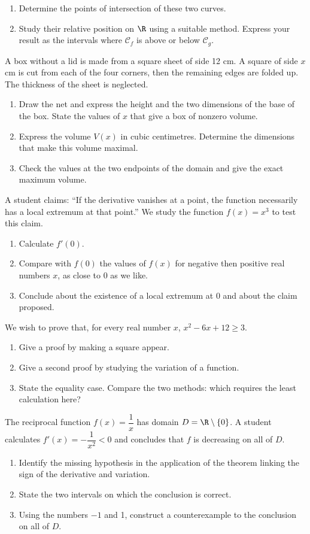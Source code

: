 \begin{enumerate}[label=\arabic*.]
\item Determine the points of intersection of these two curves.
\item Study their relative position on $\R$ using a suitable method. Express your result as the intervals where $\mathcal C_f$ is above or below $\mathcal C_g$.
\end{enumerate}
A box without a lid is made from a square sheet of side 12 cm. A square of side $x$ cm is cut from each of the four corners, then the remaining edges are folded up. The thickness of the sheet is neglected.
\begin{enumerate}[label=\arabic*.]
\item Draw the net and express the height and the two dimensions of the base of the box. State the values of $x$ that give a box of nonzero volume.
\item Express the volume $V(x)$ in cubic centimetres. Determine the dimensions that make this volume maximal.
\item Check the values at the two endpoints of the domain and give the exact maximum volume.
\end{enumerate}
A student claims: ``If the derivative vanishes at a point, the function necessarily has a local extremum at that point.'' We study the function $f(x)=x^3$ to test this claim.
\begin{enumerate}[label=\arabic*.]
\item Calculate $f\prime(0)$.
\item Compare with $f(0)$ the values of $f(x)$ for negative then positive real numbers $x$, as close to 0 as we like.
\item Conclude about the existence of a local extremum at 0 and about the claim proposed.
\end{enumerate}
We wish to prove that, for every real number $x$, $x^2-6x+12\geq3$.
\begin{enumerate}[label=\arabic*.]
\item Give a proof by making a square appear.
\item Give a second proof by studying the variation of a function.
\item State the equality case. Compare the two methods: which requires the least calculation here?
\end{enumerate}
The reciprocal function $f(x)=\dfrac1x$ has domain $D=\R\setminus\{0\}$. A student calculates $f\prime(x)=-\dfrac1{x^2}<0$ and concludes that $f$ is decreasing on all of $D$.
\begin{enumerate}[label=\arabic*.]
\item Identify the missing hypothesis in the application of the theorem linking the sign of the derivative and variation.
\item State the two intervals on which the conclusion is correct.
\item Using the numbers $-1$ and 1, construct a counterexample to the conclusion on all of $D$.
\end{enumerate}
